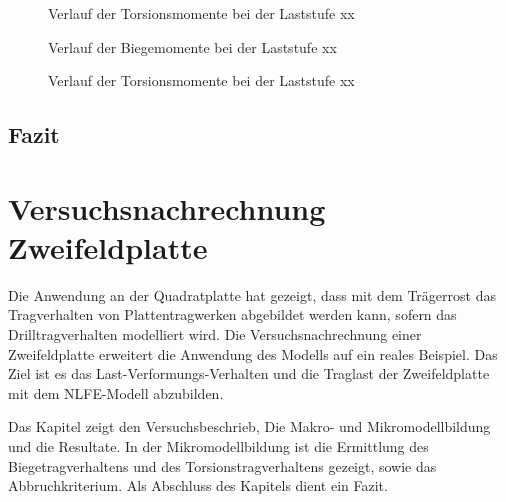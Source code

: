 \documentclass[
  11pt,
  letterpaper,
]{scrreprt}
\makeatletter
\newcommand*\pandocbounded[1]{%
  \sbox\pandoc@box{#1}%
  \Gscale@div\@tempa{\textheight}{\dimexpr\ht\pandoc@box+\dp\pandoc@box\relax}%
  \Gscale@div\@tempb{\linewidth}{\wd\pandoc@box}%
  \ifdim\@tempb\p@<\@tempa\p@\let\@tempa\@tempb\fi%
  \ifdim\@tempa\p@<\p@\scalebox{\@tempa}{\usebox\pandoc@box}%
  \else\usebox{\pandoc@box}%
  \fi%
}
\makeatother
\begin{document}
\begin{figure}[H]

\centering{

\pandocbounded{}

}

\caption{\label{fig-quad_5}Verlauf der Torsionsmomente bei der Laststufe
xx}

\end{figure}%

\begin{figure}[H]

\centering{

\pandocbounded{}

}

\caption{\label{fig-quad_3}Verlauf der Biegemomente bei der Laststufe
xx}

\end{figure}%

\begin{figure}[H]

\centering{

\pandocbounded{}

}

\caption{\label{fig-quad_6}Verlauf der Torsionsmomente bei der Laststufe
xx}

\end{figure}%

\section{Fazit}\label{fazit-2}


\chapter{Versuchsnachrechnung
Zweifeldplatte}\label{versuchsnachrechnung-zweifeldplatte}

Die Anwendung an der Quadratplatte hat gezeigt, dass mit dem Trägerrost
das Tragverhalten von Plattentragwerken abgebildet werden kann, sofern
das Drilltragverhalten modelliert wird. Die Versuchsnachrechnung einer
Zweifeldplatte erweitert die Anwendung des Modells auf ein reales
Beispiel. Das Ziel ist es das Last-Verformungs-Verhalten und die
Traglast der Zweifeldplatte mit dem NLFE-Modell abzubilden.

Das Kapitel zeigt den Versuchsbeschrieb, Die Makro- und
Mikromodellbildung und die Resultate. In der Mikromodellbildung ist die
Ermittlung des Biegetragverhaltens und des Torsionstragverhaltens
gezeigt, sowie das Abbruchkriterium. Als Abschluss des Kapitels dient
ein Fazit.
\end{document}
